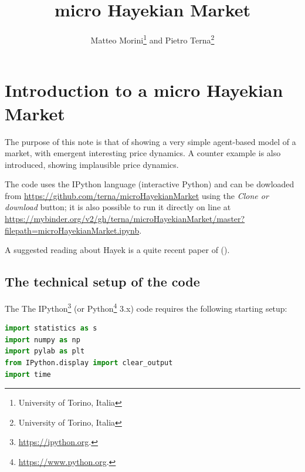 \documentclass[12pt]{report}
\title{micro Hayekian Market}
\author{Matteo Morini\footnote{University of Torino, Italia} and Pietro Terna\footnote{University of Torino, Italia}}
\begin{document}
\maketitle
\thispagestyle{fancy}

\tableofcontents
\thispagestyle{fancy}

\listoffigures
\thispagestyle{fancy}


\chapter*{Introduction to a micro Hayekian Market}
\label{micro Hayekian Market}
\thispagestyle{fancy}
%


The purpose of this note is that of showing a very simple agent-based model of a market, with emergent interesting  price dynamics. A counter example is also introduced, showing implausible price dynamics.

The code uses the IPython language (interactive Python) and can be dowloaded from \url{https://github.com/terna/microHayekianMarket} using the \emph{Clone or download} button; it is also possible to run it directly on line at \url{https://mybinder.org/v2/gh/terna/microHayekianMarket/master?filepath=microHayekianMarket.ipynb}.

A suggested reading about Hayek is a quite recent paper of \citeauthor{10.1257/jep.31.3.215} (\citeyear{10.1257/jep.31.3.215}).


\section{The technical setup of the code}\label{The technical setup of the code}

The The IPython\footnote{\url{https://ipython.org}.} (or Python\footnote{\url{https://www.python.org}.} 3.x) code requires the following starting setup:

\begin{lstlisting}[language=Python, caption=Warming up of the model, basicstyle=\ttfamily\footnotesize]
%pylab inline
import statistics as s
import numpy as np
import pylab as plt
from IPython.display import clear_output
import time
\end{lstlisting}
\end{document}
